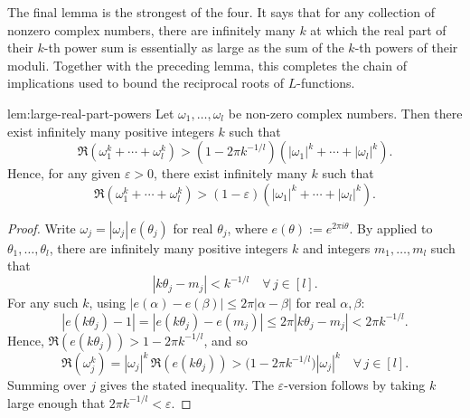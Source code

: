 The final lemma is the strongest of the four. It says that for any collection of nonzero complex numbers, there are infinitely many $k$ at which the real part of their $k$-th power sum is essentially as large as the sum of the $k$-th powers of their moduli. Together with the preceding lemma, this completes the chain of implications used to bound the reciprocal roots of $L$-functions.

\begin{Lemma}{}{lem:large-real-part-powers}
  Let $\omega_1,\dots,\omega_l$ be non-zero complex numbers. Then there exist infinitely many positive integers $k$ such that
  \[
    \Re(\omega_1^k + \cdots + \omega_l^k)
    >
    \left(1 - 2\pi k^{-1/l}\right)\left(|\omega_1|^k + \cdots + |\omega_l|^k\right).
  \]
  Hence, for any given $\varepsilon > 0$, there exist infinitely many $k$ such that
  \[
    \Re(\omega_1^k + \cdots + \omega_l^k)
    >
    (1 - \varepsilon)\left(|\omega_1|^k + \cdots + |\omega_l|^k\right).
  \]
\end{Lemma}
\begin{proof}
  Write $\omega_j = |\omega_j|\,e(\theta_j)$ for real $\theta_j$, where $e(\theta) := e^{2\pi i\theta}$. By  applied to $\theta_1,\dots,\theta_l$, there are infinitely many positive integers $k$ and integers $m_1,\dots,m_l$ such that
  \[
    |k\theta_j - m_j| < k^{-1/l} \quad \forall\, j\in[l].
  \]
  For any such $k$, using $|e(\alpha)-e(\beta)| \leq 2\pi|\alpha-\beta|$ for real $\alpha,\beta$:
  \[
    |e(k\theta_j) - 1|
    = |e(k\theta_j) - e(m_j)|
    \leq 2\pi|k\theta_j - m_j|
    < 2\pi k^{-1/l}.
  \]
  Hence, $\Re(e(k\theta_j)) > 1 - 2\pi k^{-1/l}$, and so
  \[
    \Re(\omega_j^k) = |\omega_j|^k\,\Re(e(k\theta_j)) > \bigl(1-2\pi k^{-1/l}\bigr)|\omega_j|^k \quad \forall\, j\in[l].
  \]
  Summing over $j$ gives the stated inequality. The $\varepsilon$-version follows by taking $k$ large enough that $2\pi k^{-1/l} < \varepsilon$.
\end{proof}